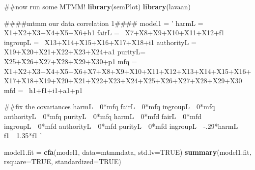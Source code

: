 \documentclass[english,man]{apa6}
\newenvironment{Shaded}{\begin{snugshade}}{\end{snugshade}}
\newcommand{\KeywordTok}[1]{\textcolor[rgb]{0.13,0.29,0.53}{\textbf{#1}}}
\newcommand{\DataTypeTok}[1]{\textcolor[rgb]{0.13,0.29,0.53}{#1}}
\newcommand{\StringTok}[1]{\textcolor[rgb]{0.31,0.60,0.02}{#1}}
\newcommand{\OtherTok}[1]{\textcolor[rgb]{0.56,0.35,0.01}{#1}}
\newcommand{\NormalTok}[1]{#1}
\newcounter{author}
\theoremstyle{definition}
\theoremstyle{definition}
\theoremstyle{definition}
\theoremstyle{remark}
\begin{document}
\begin{Shaded}
\begin{Highlighting}[]
\NormalTok{##now run some MTMM!}
\KeywordTok{library}\NormalTok{(semPlot)}
\KeywordTok{library}\NormalTok{(lavaan)}

\NormalTok{####mtmm our data correlation 1####}
\NormalTok{model1 =}\StringTok{ '}
\StringTok{harmL =~ X1+X2+X3+X4+X5+X6+h1}
\StringTok{fairL =~ X7+X8+X9+X10+X11+X12+f1}
\StringTok{ingroupL =~ X13+X14+X15+X16+X17+X18+i1}
\StringTok{authorityL =~ X19+X20+X21+X22+X23+X24+a1}
\StringTok{purityL=~ X25+X26+X27+X28+X29+X30+p1}
\StringTok{mfq =~ X1+X2+X3+X4+X5+X6+X7+X8+X9+X10+X11+X12+X13+X14+X15+X16+X17+X18+X19+X20+X21+X22+X23+X24+X25+X26+X27+X28+X29+X30}
\StringTok{mfd =~ h1+f1+i1+a1+p1}

\StringTok{##fix the covariances}
\StringTok{harmL~~0*mfq}
\StringTok{fairL~~0*mfq}
\StringTok{ingroupL~~0*mfq}
\StringTok{authorityL~~0*mfq}
\StringTok{purityL~~0*mfq}
\StringTok{harmL~~0*mfd}
\StringTok{fairL~~0*mfd}
\StringTok{ingroupL~~0*mfd}
\StringTok{authorityL~~0*mfd}
\StringTok{purityL~~0*mfd}
\StringTok{ingroupL~~-.29*harmL}
\StringTok{f1~~1.35*f1}
\StringTok{'}

\NormalTok{model1.fit =}\StringTok{ }\KeywordTok{cfa}\NormalTok{(model1, }\DataTypeTok{data=}\NormalTok{mtmmdata, }\DataTypeTok{std.lv=}\OtherTok{TRUE}\NormalTok{)}
\KeywordTok{summary}\NormalTok{(model1.fit, }\DataTypeTok{rsquare=}\OtherTok{TRUE}\NormalTok{, }\DataTypeTok{standardized=}\OtherTok{TRUE}\NormalTok{)}
\end{Highlighting}
\end{Shaded}
\end{document}
